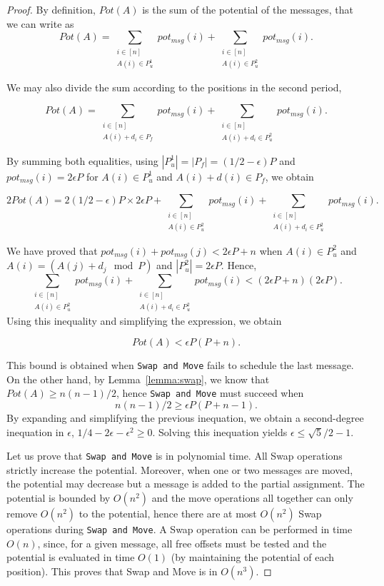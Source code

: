 \documentclass[a4paper,UKenglish,cleveref, autoref, thm-restate]{lipics-v2019}
\newcommand\swapandmove{\texttt{Swap and Move}\xspace}
\begin{document}
\begin{proof}
By definition, $Pot(A)$ is the sum of the potential of the messages, that we can write as 
$$Pot(A) = \sum_{\substack{i \in [n] \\ A(i) \in P^1_u} } pot_{msg}(i) + \sum_{\substack{i \in [n] \\ A(i) \in P^2_u} } pot_{msg}(i).$$

We may also divide the sum according to the positions in the second period,

$$Pot(A) = \sum_{\substack{i \in [n] \\ A(i) + d_i \in P_f} } pot_{msg}(i) + \sum_{\substack{i \in [n] \\ A(i) + d_i \in P^2_u} } pot_{msg}(i).$$

By summing both equalities, using $|P^1_u| = |P_f| = (1/2 - \epsilon)P$ and 
$pot_{msg}(i) = 2\epsilon P$ for $A(i) \in P^1_u$ and  $A(i) + d(i) \in P_f$, we obtain  


$$2Pot(A) = 2(1/2 - \epsilon)P \times 2\epsilon P + \sum_{\substack{i \in [n] \\ A(i) \in P^2_u} } pot_{msg}(i) + \sum_{\substack{i \in [n] \\ A(i) + d_i \in P^2_u} } pot_{msg}(i).$$


We have proved that $pot_{msg}(i) + pot_{msg}(j) < 2\epsilon P + n$ when $A(i) \in P^2_u$ and $A(i) = (A(j) + d_j \mod P)$ and  $|P^2_u| = 2\epsilon P$.
Hence, $$\sum_{\substack{i \in [n] \\ A(i) \in P^2_u} } pot_{msg}(i) + \sum_{\substack{i \in [n] \\ A(i) + d_i \in P^2_u} } pot_{msg}(i) < (2\epsilon P + n)(2\epsilon P).$$
Using this inequality and simplifying the expression, we obtain 


$$  Pot(A) < \epsilon P (P + n).$$

This bound is obtained when \swapandmove fails to schedule the last message.
On the other hand, by Lemma~\ref{lemma:swap}, we know that $Pot(A) \geq n(n-1)/2$, hence 
\swapandmove must succeed when
$$n(n-1)/2 \geq  \epsilon P (P + n -1).$$
By expanding and simplifying the previous inequation, we obtain a second-degree inequation in $\epsilon$, $1/4 - 2\epsilon - \epsilon ^2 \geq  0$.
Solving this inequation yields $\epsilon \leq \sqrt{5}/2 -1$.


Let us prove that \swapandmove is in polynomial time. All Swap operations 
strictly increase the potential. Moreover, when one or two messages are moved, the potential may decrease but a message is added to the partial assignment. The potential is bounded by $O(n^2)$ and the move operations all together can only remove $O(n^2)$ to the potential, hence there are at most $O(n^2)$ Swap operations during \swapandmove. A Swap operation can be performed in time $O(n)$, since, for a given message, all free offsets must be tested and the potential is evaluated in time $O(1)$ (by maintaining the potential of each position). This proves that Swap and Move is in $O(n^3)$.  
\end{proof}
\end{document}
